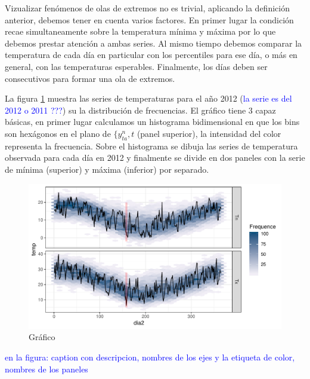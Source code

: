 \documentclass[12pt]{article}\usepackage[]{graphicx}\usepackage[]{color}
\makeatletter
\def\maxwidth{ %
  \ifdim\Gin@nat@width>\linewidth
    \linewidth
  \else
    \Gin@nat@width
  \fi
}
\newenvironment{knitrout}{}{} %
\makeatother
\begin{document}
Vizualizar fenómenos de olas de extremos no es trivial, aplicando la definición anterior, debemos tener en cuenta varios factores. En primer lugar la condición recae simultaneamente sobre la temperatura mínima y máxima por lo que debemos prestar atención a ambas series. Al mismo tiempo debemos comparar la temperatura de cada día en particular con los percentiles para ese día, o más en general, con las temperaturas esperables. Finalmente, los días deben ser consecutivos para formar una ola de extremos. 

La figura \ref{fig:graf1} muestra las series de temperaturas para el año 2012 (\textcolor{blue}{la serie es del 2012 o 2011 ???}) su la distribución de frecuencias. El gráfico tiene 3 capaz básicas, en primer lugar calculamos un histograma bidimensional en que los bins son hexágonos en el plano de $\{ y^n_{ta}, t$ (panel superior), la intensidad del color representa la frecuencia. Sobre el histograma se dibuja las series de temperatura observada para cada día en 2012 y finalmente se divide en dos paneles con la serie de mínima (superior) y máxima (inferior) por separado. 

\begin{knitrout}
\color{fgcolor}\begin{figure}

{\centering \includegraphics[width=\maxwidth]{figure/graf1-1} 

}

\caption[Gráfico]{Gráfico}\label{fig:graf1}
\end{figure}


\end{knitrout}
\textcolor{blue}{en la figura: caption con descripcion, nombres de los ejes y la etiqueta de color, nombres de los paneles}
\end{document}
